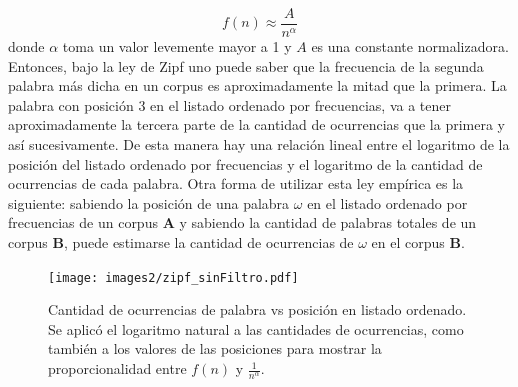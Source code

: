 $$f(n) \approx \frac{A}{n^{\alpha}}$$
donde $\alpha$ toma un valor levemente mayor a 1 y $A$ es una constante normalizadora.
Entonces, bajo la ley de Zipf uno puede saber que la frecuencia de la segunda palabra más dicha en un corpus es aproximadamente la mitad que la primera. La palabra con posición 3 en el listado ordenado por frecuencias, va a tener aproximadamente la tercera parte de la cantidad de ocurrencias que la primera y así sucesivamente. De esta manera hay una relación lineal entre el logaritmo de la posición del listado ordenado por frecuencias y el logaritmo de la cantidad de ocurrencias de cada palabra.
Otra forma de utilizar esta ley empírica es la siguiente:
sabiendo la posición de una palabra $\omega$ en el listado ordenado por frecuencias de un corpus \textbf{A} y sabiendo la cantidad de palabras totales de un corpus \textbf{B}, puede estimarse la cantidad de ocurrencias de $\omega$ en el corpus \textbf{B}.

\begin{figure}[!ht]
\centering
\texttt{[image: images2/zipf\_sinFiltro.pdf]}
\caption{Cantidad de ocurrencias de palabra vs posición en listado ordenado. Se aplicó el logaritmo natural a las cantidades de ocurrencias, como también a los valores de las posiciones para mostrar la proporcionalidad entre $f(n)$ y $\frac{1}{n^{\alpha}}$.} 
\label{fig:zipf} 
\end{figure}











